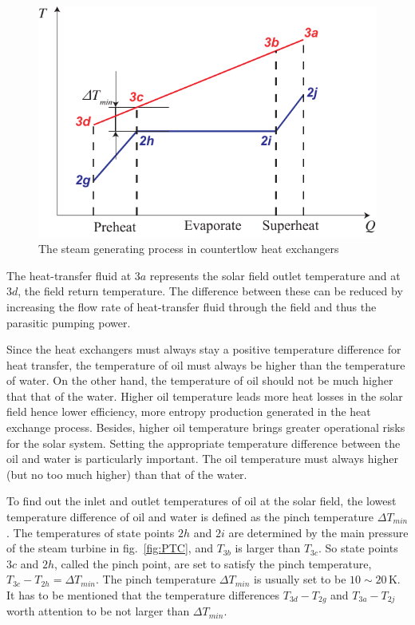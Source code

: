 \noindent \begin{figure}[htbp]
\begin{center}
	\includegraphics[width = 0.7\columnwidth]{fig/DeltaTmin}
	\caption{The steam generating process in countertlow heat exchangers}
	\label{fig:DeltaTmin}
\end{center}
\end{figure}

The heat-transfer fluid at $3a$ represents the solar field outlet temperature and at $3d$, the field return temperature. The difference between these can be reduced by increasing the flow rate of heat-transfer fluid through the field and thus the parasitic pumping power.

Since the heat exchangers must always stay a positive temperature difference for heat transfer, the temperature of oil must always be higher than the temperature of water. On the other hand, the temperature of oil should not be much higher that that of the water. Higher oil temperature leads more heat losses in the solar field hence lower efficiency, more entropy production generated in the heat exchange process. Besides, higher oil temperature brings greater operational risks for the solar system. Setting the appropriate temperature difference between the oil and water is particularly important. The oil temperature must always higher (but no too much higher) than that of the water.

To find out the inlet and outlet temperatures of oil at the solar field, the lowest temperature difference of oil and water is defined as the pinch temperature $\Delta T_{min}$. The temperatures of state points $2h$ and $2i$ are determined by the main pressure of the steam turbine in fig.~\ref{fig:PTC}, and $T_{3b}$ is larger than $T_{3c}$. So state points $3c$ and $2h$, called the pinch point, are set to satisfy the pinch temperature, $T_{3c} - T_{2h} = \Delta T_{min}$. The pinch temperature $\Delta T_{min}$ is usually set to be $10\sim 20\,\mathrm{K}$.
It has to be mentioned that the temperature differences $T_{3d} - T_{2g}$ and $T_{3a} - T_{2j}$ worth attention to be not larger than $\Delta T_{min}$.

